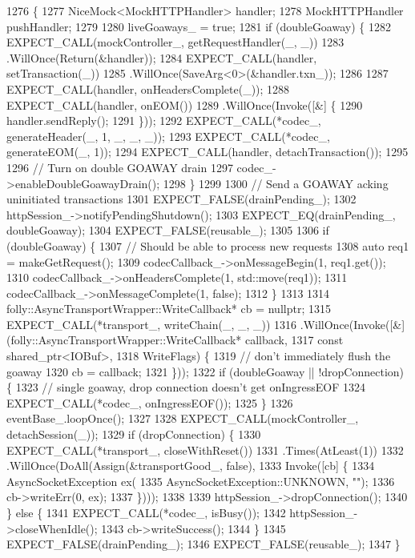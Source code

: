 \begin{DoxyCode}
1276                                                               \{
1277   NiceMock<MockHTTPHandler> handler;
1278   MockHTTPHandler pushHandler;
1279 
1280   liveGoaways_ = \textcolor{keyword}{true};
1281   \textcolor{keywordflow}{if} (doubleGoaway) \{
1282     EXPECT\_CALL(mockController_, getRequestHandler(\_, \_))
1283       .WillOnce(Return(&handler));
1284     EXPECT\_CALL(handler, setTransaction(\_))
1285       .WillOnce(SaveArg<0>(&handler.txn\_));
1286 
1287     EXPECT\_CALL(handler, onHeadersComplete(\_));
1288     EXPECT\_CALL(handler, onEOM())
1289       .WillOnce(Invoke([&] \{
1290             handler.sendReply();
1291           \}));
1292     EXPECT\_CALL(*codec_, generateHeader(\_, 1, \_, \_, \_));
1293     EXPECT\_CALL(*codec_, generateEOM(\_, 1));
1294     EXPECT\_CALL(handler, detachTransaction());
1295 
1296     \textcolor{comment}{// Turn on double GOAWAY drain}
1297     codec_->enableDoubleGoawayDrain();
1298   \}
1299 
1300   \textcolor{comment}{// Send a GOAWAY acking uninitiated transactions}
1301   EXPECT\_FALSE(drainPending_);
1302   httpSession_->notifyPendingShutdown();
1303   EXPECT\_EQ(drainPending_, doubleGoaway);
1304   EXPECT\_FALSE(reusable_);
1305 
1306   \textcolor{keywordflow}{if} (doubleGoaway) \{
1307     \textcolor{comment}{// Should be able to process new requests}
1308     \textcolor{keyword}{auto} req1 = makeGetRequest();
1309     codecCallback_->onMessageBegin(1, req1.get());
1310     codecCallback_->onHeadersComplete(1, std::move(req1));
1311     codecCallback_->onMessageComplete(1, \textcolor{keyword}{false});
1312   \}
1313 
1314   folly::AsyncTransportWrapper::WriteCallback* cb = \textcolor{keyword}{nullptr};
1315   EXPECT\_CALL(*transport_, writeChain(\_, \_, \_))
1316     .WillOnce(Invoke([&] (folly::AsyncTransportWrapper::WriteCallback* callback,
1317                           \textcolor{keyword}{const} shared\_ptr<IOBuf>,
1318                           WriteFlags) \{
1319                        \textcolor{comment}{// don't immediately flush the goaway}
1320                        cb = callback;
1321                      \}));
1322   \textcolor{keywordflow}{if} (doubleGoaway || !dropConnection) \{
1323     \textcolor{comment}{// single goaway, drop connection doesn't get onIngressEOF}
1324     EXPECT\_CALL(*codec_, onIngressEOF());
1325   \}
1326   eventBase_.loopOnce();
1327 
1328   EXPECT\_CALL(mockController_, detachSession(\_));
1329   \textcolor{keywordflow}{if} (dropConnection) \{
1330     EXPECT\_CALL(*transport_, closeWithReset())
1331       .Times(AtLeast(1))
1332       .WillOnce(DoAll(Assign(&transportGood_, \textcolor{keyword}{false}),
1333                       Invoke([cb] \{
1334                           AsyncSocketException ex(
1335                             AsyncSocketException::UNKNOWN, \textcolor{stringliteral}{""});
1336                           cb->writeErr(0, ex);
1337                         \})));
1338 
1339     httpSession_->dropConnection();
1340   \} \textcolor{keywordflow}{else} \{
1341     EXPECT\_CALL(*codec_, isBusy());
1342     httpSession_->closeWhenIdle();
1343     cb->writeSuccess();
1344   \}
1345   EXPECT\_FALSE(drainPending_);
1346   EXPECT\_FALSE(reusable_);
1347 \}
\end{DoxyCode}


